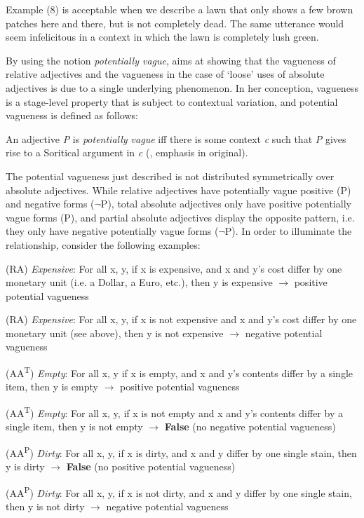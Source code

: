 \documentclass[output=paper
,modfonts
,nonflat]{langsci/langscibook}
\begin{document}
Example (8) is acceptable when we describe a lawn that only shows a few brown patches here and there, but is not completely dead. The same utterance would seem infelicitous in a context in which the lawn is completely lush green.

By using the notion \textit{potentially vague}, \textcite[49]{Burnett2017} aims at showing that the vagueness of relative adjectives and the vagueness in the case of `loose' uses of absolute adjectives is due to a single underlying phenomenon. In her conception, vagueness is a stage-level property that is subject to contextual variation, and potential vagueness is defined as follows:

\begin{examples}
	\item An adjective \textit{P} is \textit{potentially vague} iff there is some context \textit{c} such that \textit{P} gives rise to a Soritical argument in \textit{c} (\textcite[50]{Burnett2017}, emphasis in original). %
\end{examples}

The potential vagueness just described is not distributed symmetrically over absolute adjectives. While relative adjectives have potentially vague positive (P) and negative forms ($\neg$P), total absolute adjectives only have positive potentially vague forms (P), and partial absolute adjectives display the opposite pattern, i.e. they only have negative potentially vague forms ($\neg$P). In order to illuminate the relationship, consider the following examples: %

\begin{examples}
	\item (RA) \textit{Expensive}: For all x, y, if x is expensive, and x and y's cost differ by one monetary unit (i.e. a Dollar, a Euro, etc.), then y is expensive {$\rightarrow$ \0} positive potential vagueness
	\item (RA) \textit{Expensive}: For all x, y, if x is not expensive and x and y's cost differ by one monetary unit (see above), then y is not expensive {$\rightarrow$ \0} negative potential vagueness
	\item (AA\textsuperscript{T}) \textit{Empty}: For all x, y if x is empty, and x and y's contents differ by a single item, then y is empty {$\rightarrow$ \0} positive potential vagueness
	\item (AA\textsuperscript{T}) \textit{Empty}: For all x, y, if x is not empty and x and y's contents differ by a single item, then y is not empty {$\rightarrow$ \0} \textbf{False} (no negative potential vagueness)
	\item (AA\textsuperscript{P}) \textit{Dirty}: For all x, y, if x is dirty, and x and y differ by one single stain, then y is dirty {$\rightarrow$ \0} \textbf{False} (no positive potential vagueness)
	\item (AA\textsuperscript{P}) \textit{Dirty}: For all x, y, if x is not dirty, and x and y differ by one single stain, then y is not dirty {$\rightarrow$ \0} negative potential vagueness
\end{examples} %
\end{document}

